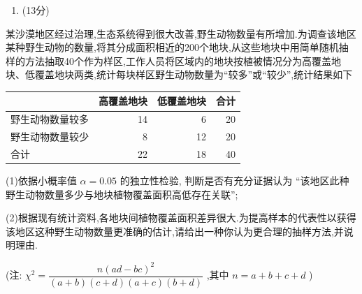 \documentclass[UTF8,12pt,a4paper]{ctexart}
\renewcommand{\labelenumi}{\arabic{enumi}.}
\providecommand{\toprule}{\hline}
\providecommand{\midrule}{\hline}
\providecommand{\bottomrule}{\hline}
\providecommand{\tightlist}{%
  \setlength{\itemsep}{0pt}\setlength{\parskip}{0pt}}
\begin{document}
\begin{enumerate}
\def\labelenumi{\arabic{enumi}.}
\setcounter{enumi}{14}
\tightlist
\item
  (13分)
\end{enumerate}

某沙漠地区经过治理,生态系统得到很大改善,野生动物数量有所增加.为调查该地区某种野生动物的数量,将其分成面积相近的200个地块,从这些地块中用简单随机抽样的方法抽取40个作为样区,工作人员将区域内的地块按植被情况分为高覆盖地块、低覆盖地块两类,统计每块样区野生动物数量为``较多''或``较少'',统计结果如下

\begin{longtable}[]{@{}lrrr@{}}
\toprule\noalign{}
& 高覆盖地块 & 低覆盖地块 & 合计 \\
\midrule\noalign{}
\endhead
\bottomrule\noalign{}
\endlastfoot
野生动物数量较多 & 14 & 6 & 20 \\
野生动物数量较少 & 8 & 12 & 20 \\
合计 & 22 & 18 & 40 \\
\end{longtable}

(1)依据小概率值 \(\alpha = 0.05\) 的独立性检验, 判断是否有充分证据认为 ``该地区此种野生动物数量多少与地块植物覆盖面积高低存在关联'';

(2)根据现有统计资料,各地块间植物覆盖面积差异很大.为提高样本的代表性以获得该地区这种野生动物数量更准确的估计,请给出一种你认为更合理的抽样方法,并说明理由.

(注: \(\chi^{2}=\dfrac{n(ad-bc)^{2}}{(a+b)(c+d)(a+c)(b+d)}\) ,其中 \(n=a+b+c+d\) )
\end{document}
